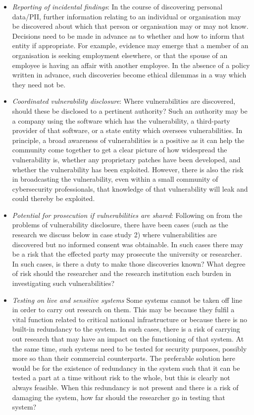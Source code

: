 \documentclass{svjour3}                     %
\begin{document}
\begin{itemize}
\item \emph{Reporting of incidental findings}:
In the course of discovering personal data/PII, further information relating to an individual or organisation may be discovered about which that person or organisation may or may not know.  Decisions need to be made in advance as to whether and how to inform that entity if appropriate. For example, evidence may emerge that a member of an organisation is seeking employment elsewhere, or that the spouse of an employee is having an affair with another employee. In the absence of a policy written in advance, such discoveries become ethical dilemmas in a way which they need not be.

\item \emph{Coordinated vulnerability disclosure}:
Where vulnerabilities are discovered, should these be disclosed to a pertinent authority? Such an authority may be a company using the software which has the vulnerability, a third-party provider of that software, or a state entity which oversees vulnerabilities. In principle, a broad awareness of vulnerabilities is a positive as it can help the community come together to get a clear picture of how widespread the vulnerability is, whether any proprietary patches have been developed, and whether the vulnerability has been exploited. However, there is also the risk in broadcasting the vulnerability, even within a small community of cybersecurity professionals, that knowledge of that vulnerability will leak and could thereby be exploited.

\item \emph{Potential for prosecution if vulnerabilities are shared}:
Following on from the problems of vulnerability disclosure, there have been cases (such as the research we discuss below in case study 2) where vulnerabilities are discovered but no informed consent was obtainable. In such cases there may be a risk that the effected party may prosecute the university or researcher. In such cases, is there a duty to make those discoveries known? What degree of risk should the researcher and the research institution each burden in investigating such vulnerabilities?

\item \emph{Testing on live and sensitive systems}
Some systems cannot be taken off line in order to carry out research on them. This may be because they fulfil a vital function related to critical national infrastructure or because there is no built-in redundancy to the system. In such cases, there is a risk of carrying out research that may have an impact on the functioning of that system. At the same time, such systems need to be tested for security purposes, possibly more so than their commercial counterparts. The preferable solution here would be for the existence of redundancy in the system such that it can be tested a part at a time without risk to the whole, but this is clearly not always feasible. When this redundancy is not present and there is a risk of damaging the system, how far should the researcher go in testing that system?


\end{itemize}
\end{document}
